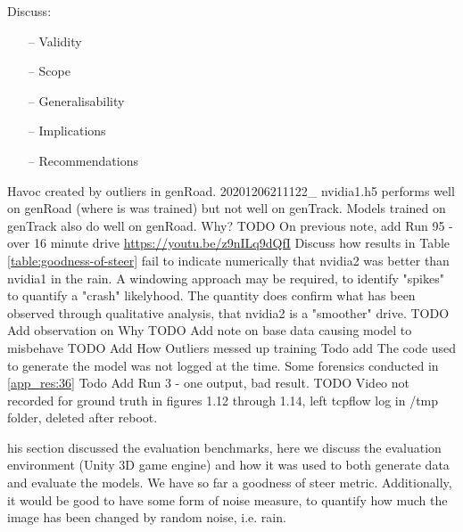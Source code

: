 
Discuss:
\begin{itemize}
    \item[--] Validity
    \item[--] Scope
    \item[--] Generalisability
    \item[--] Implications
    \item[--] Recommendations
\end{itemize}
Havoc created by outliers in genRoad. 20201206211122\_ nvidia1.h5 performs well on genRoad (where is was trained) but not well on genTrack. Models trained on genTrack also do well on genRoad. Why?
TODO On previous note, add Run 95 - over 16 minute drive \url{https://youtu.be/z9nILq9dQfI}  
Discuss how results in Table \ref{table:goodness-of-steer} fail to indicate numerically that nvidia2 was better than nvidia1 in the rain. A windowing approach may be required, to identify "spikes" to quantify a "crash" likelyhood. The quantity does confirm what has been observed through qualitative analysis, that nvidia2 is a "smoother" drive.  
TODO Add observation on Why
TODO Add note on base data causing model to misbehave
TODO Add How Outliers messed up training
Todo add The code used to generate the model was not logged at the time. Some forensics conducted in \ref{app_res:36}
Todo Add Run 3 - one output, bad result.
TODO Video not recorded for ground truth in figures 1.12 through 1.14, left tcpflow log in /tmp folder, deleted after reboot.


his section discussed the evaluation benchmarks, here we discuss the evaluation environment (Unity 3D game engine) and how it was used to both generate data and evaluate the models.
We have so far a goodness of steer metric. Additionally, it would be good to have some form of noise measure, to quantify how much the image has been changed by random noise, i.e. rain.



